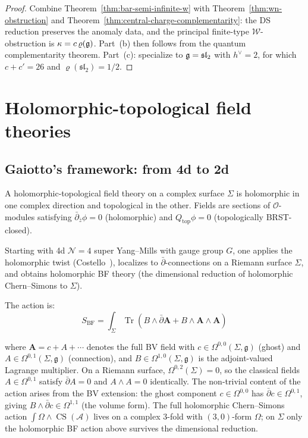 \begin{proof}
Combine Theorem~\ref{thm:bar-semi-infinite-w} with
Theorem~\ref{thm:wn-obstruction} and
Theorem~\ref{thm:central-charge-complementarity}: the DS reduction
preserves the anomaly data, and the principal finite-type
$\mathcal{W}$-obstruction is $\kappa = c\,\varrho(\mathfrak{g})$.
Part~(b) then follows from the quantum complementarity theorem.
Part~(c): specialize to $\mathfrak{g} = \mathfrak{sl}_2$ with $h^\vee = 2$,
for which $c + c' = 26$ and $\varrho(\mathfrak{sl}_2)=1/2$.
\end{proof}

\section{Holomorphic-topological field theories}

\subsection{Gaiotto's framework: from 4d to 2d}

\begin{definition}
A holomorphic-topological field theory on a complex surface $\Sigma$ is holomorphic in one complex direction and topological in the other.  Fields are sections of $\mathcal{O}$-modules satisfying $\bar{\partial}_{\bar{z}} \phi = 0$ (holomorphic) and $Q_{\text{top}} \phi = 0$ (topologically BRST-closed).
\end{definition}

\begin{theorem}[HT theory from 4d \texorpdfstring{$\mathcal{N}=4$}{N=4} SYM; \ClaimStatusProvedElsewhere]
\label{thm:ht-from-n4-sym}
Starting with 4d $\mathcal{N}=4$ super Yang--Mills with gauge group $G$, one applies the holomorphic twist (Costello~\cite{costello-gaiotto}), localizes to $\bar{\partial}$-connections on a Riemann surface $\Sigma$, and obtains holomorphic BF theory (the dimensional reduction of holomorphic Chern--Simons to $\Sigma$).

The action is:
\[S_{\text{BF}} = \int_{\Sigma} \operatorname{Tr}\!\left(B \wedge \bar{\partial} \mathbf{A} + B \wedge \mathbf{A} \wedge \mathbf{A}\right)\]

where $\mathbf{A} = c + A + \cdots$ denotes the full BV field with $c \in \Omega^{0,0}(\Sigma, \mathfrak{g})$ (ghost) and $A \in \Omega^{0,1}(\Sigma, \mathfrak{g})$ (connection), and $B \in \Omega^{1,0}(\Sigma, \mathfrak{g})$ is the adjoint-valued Lagrange multiplier.
On a Riemann surface, $\Omega^{0,2}(\Sigma) = 0$, so the classical fields
$A \in \Omega^{0,1}$ satisfy $\bar{\partial}A = 0$ and $A \wedge A = 0$ identically.  The non-trivial
content of the action arises from the BV extension: the ghost component $c \in \Omega^{0,0}$ has
$\bar{\partial}c \in \Omega^{0,1}$, giving $B \wedge \bar{\partial}c \in \Omega^{1,1}$ (the volume form).
The full holomorphic Chern--Simons action $\int \Omega \wedge \operatorname{CS}(\mathcal{A})$ lives on a
complex $3$-fold with $(3,0)$-form $\Omega$; on $\Sigma$ only the holomorphic BF action above survives the dimensional reduction.
\end{theorem}

